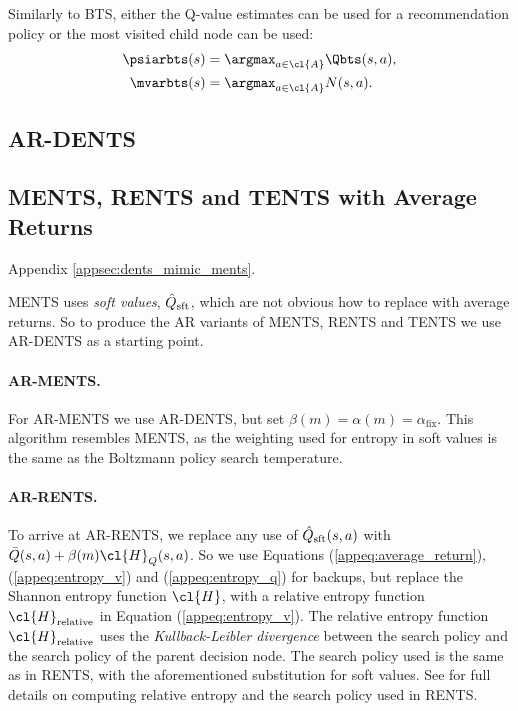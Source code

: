     Similarly to BTS, either the Q-value estimates can be used for a recommendation policy or the most visited child node can be used:
    \begin{align}
        \psiarbts(s) &= \argmax_{a\in\cl{A}}\Qbts(s,a), \\
        \mvarbts(s) &= \argmax_{a\in\cl{A}} N(s,a).
    \end{align}


\subsection{AR-DENTS}
\label{appsec:ardents}



\subsection{MENTS, RENTS and TENTS with Average Returns} 
\label{appsec:arments}


     Appendix \ref{appsec:dents_mimic_ments}.


    MENTS uses \textit{soft values}, $\hat{Q}_{\textnormal{sft}}$, which are not obvious how to replace with average returns. So to produce the AR variants of MENTS, RENTS and TENTS we use AR-DENTS as a starting point. 

    \paragraph{AR-MENTS.} For AR-MENTS we use AR-DENTS, but set $\beta(m)=\alpha(m)=\alpha_{\text{fix}}$. This algorithm resembles MENTS, as the weighting used for entropy in soft values is the same as the Boltzmann policy search temperature. 

    \paragraph{AR-RENTS.} To arrive at AR-RENTS, we replace any use of $\hat{Q}_{\textnormal{sft}}(s,a)$ with $\bar{Q}(s,a)+\beta(m)\cl{H}_Q(s,a)$. So we use Equations (\ref{appeq:average_return}), (\ref{appeq:entropy_v}) and (\ref{appeq:entropy_q}) for backups, but replace the Shannon entropy function $\cl{H}$, with a relative entropy function $\cl{H}_{\textnormal{relative}}$ in Equation (\ref{appeq:entropy_v}). The relative entropy function $\cl{H}_{\textnormal{relative}}$ uses the \textit{Kullback-Leibler divergence} between the search policy and the search policy of the parent decision node. The search policy used is the same as in RENTS, with the aforementioned substitution for soft values. See %
        for full details on computing relative entropy and the search policy used in RENTS. 

